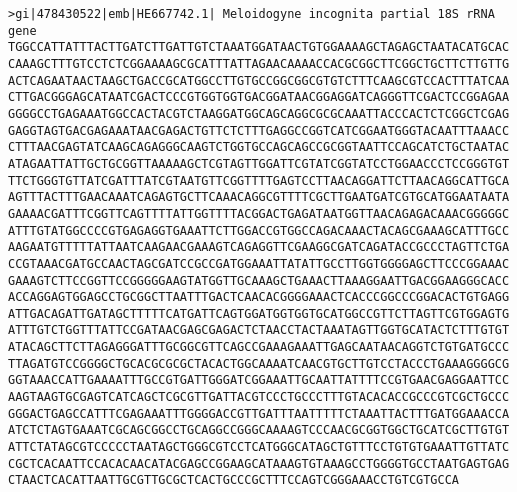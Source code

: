 \documentclass[11pt]{article}
\begin{document}
\begin{Verbatim}[commandchars=\\\{\}]
>gi|478430522|emb|HE667742.1| Meloidogyne incognita partial 18S rRNA gene
TGGCCATTATTTACTTGATCTTGATTGTCTAAATGGATAACTGTGGAAAAGCTAGAGCTAATACATGCAC
CAAAGCTTTGTCCTCTCGGAAAAGCGCATTTATTAGAACAAAACCACGCGGCTTCGGCTGCTTCTTGTTG
ACTCAGAATAACTAAGCTGACCGCATGGCCTTGTGCCGGCGGCGTGTCTTTCAAGCGTCCACTTTATCAA
CTTGACGGGAGCATAATCGACTCCCGTGGTGGTGACGGATAACGGAGGATCAGGGTTCGACTCCGGAGAA
GGGGCCTGAGAAATGGCCACTACGTCTAAGGATGGCAGCAGGCGCGCAAATTACCCACTCTCGGCTCGAG
GAGGTAGTGACGAGAAATAACGAGACTGTTCTCTTTGAGGCCGGTCATCGGAATGGGTACAATTTAAACC
CTTTAACGAGTATCAAGCAGAGGGCAAGTCTGGTGCCAGCAGCCGCGGTAATTCCAGCATCTGCTAATAC
ATAGAATTATTGCTGCGGTTAAAAAGCTCGTAGTTGGATTCGTATCGGTATCCTGGAACCCTCCGGGTGT
TTCTGGGTGTTATCGATTTATCGTAATGTTCGGTTTTGAGTCCTTAACAGGATTCTTAACAGGCATTGCA
AGTTTACTTTGAACAAATCAGAGTGCTTCAAACAGGCGTTTTCGCTTGAATGATCGTGCATGGAATAATA
GAAAACGATTTCGGTTCAGTTTTATTGGTTTTACGGACTGAGATAATGGTTAACAGAGACAAACGGGGGC
ATTTGTATGGCCCCGTGAGAGGTGAAATTCTTGGACCGTGGCCAGACAAACTACAGCGAAAGCATTTGCC
AAGAATGTTTTTATTAATCAAGAACGAAAGTCAGAGGTTCGAAGGCGATCAGATACCGCCCTAGTTCTGA
CCGTAAACGATGCCAACTAGCGATCCGCCGATGGAAATTATATTGCCTTGGTGGGGAGCTTCCCGGAAAC
GAAAGTCTTCCGGTTCCGGGGGAAGTATGGTTGCAAAGCTGAAACTTAAAGGAATTGACGGAAGGGCACC
ACCAGGAGTGGAGCCTGCGGCTTAATTTGACTCAACACGGGGAAACTCACCCGGCCCGGACACTGTGAGG
ATTGACAGATTGATAGCTTTTTCATGATTCAGTGGATGGTGGTGCATGGCCGTTCTTAGTTCGTGGAGTG
ATTTGTCTGGTTTATTCCGATAACGAGCGAGACTCTAACCTACTAAATAGTTGGTGCATACTCTTTGTGT
ATACAGCTTCTTAGAGGGATTTGCGGCGTTCAGCCGAAAGAAATTGAGCAATAACAGGTCTGTGATGCCC
TTAGATGTCCGGGGCTGCACGCGCGCTACACTGGCAAAATCAACGTGCTTGTCCTACCCTGAAAGGGGCG
GGTAAACCATTGAAAATTTGCCGTGATTGGGATCGGAAATTGCAATTATTTTCCGTGAACGAGGAATTCC
AAGTAAGTGCGAGTCATCAGCTCGCGTTGATTACGTCCCTGCCCTTTGTACACACCGCCCGTCGCTGCCC
GGGACTGAGCCATTTCGAGAAATTTGGGGACCGTTGATTTAATTTTTCTAAATTACTTTGATGGAAACCA
ATCTCTAGTGAAATCGCAGCGGCCTGCAGGCCGGGCAAAAGTCCCAACGCGGTGGCTGCATCGCTTGTGT
ATTCTATAGCGTCCCCCTAATAGCTGGGCGTCCTCATGGGCATAGCTGTTTCCTGTGTGAAATTGTTATC
CGCTCACAATTCCACACAACATACGAGCCGGAAGCATAAAGTGTAAAGCCTGGGGTGCCTAATGAGTGAG
CTAACTCACATTAATTGCGTTGCGCTCACTGCCCGCTTTCCAGTCGGGAAACCTGTCGTGCCA


\end{Verbatim}
\end{document}
